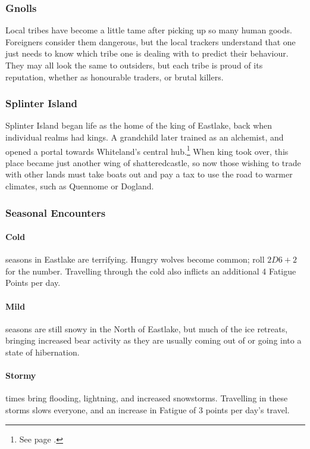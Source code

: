 \begin{multicols}{2}
\subsubsection{Gnolls}

Local tribes have become a little tame after picking up so many human goods.
Foreigners consider them dangerous, but the local trackers understand that one just needs to know which tribe one is dealing with to predict their behaviour.
They may all look the same to outsiders, but each tribe is proud of its reputation, whether as honourable traders, or brutal killers.

\subsubsection{Splinter Island}

Splinter Island began life as the home of the king of Eastlake, back when individual realms had kings.
A grandchild later trained as an alchemist, and opened a portal towards Whiteland's central hub.\footnote{See page \pageref{whiteland_heart}.}
When \gls{king} took over, this place became just another wing of \gls{shatteredcastle}, so now those wishing to trade with other lands must take boats out and pay a tax to use the road to warmer climates, such as Quennome or Dogland.

\subsubsection{Seasonal Encounters}

\paragraph{Cold} seasons in Eastlake are terrifying.
Hungry wolves become common; roll $2D6 + 2$ for the number.
Travelling through the cold also inflicts an additional 4 Fatigue Points per day.
\paragraph{Mild} seasons are still snowy in the North of Eastlake, but much of the ice retreats, bringing increased bear activity as they are usually coming out of or going into a state of hibernation.
\paragraph{Stormy} times bring flooding, lightning, and increased snowstorms.
Travelling in these storms slows everyone, and an increase in Fatigue of 3 points per day's travel.

\end{multicols}
